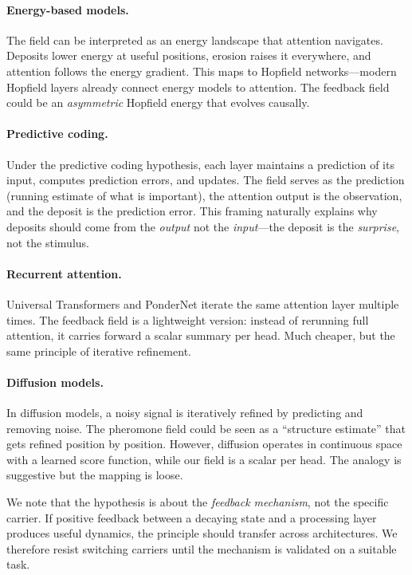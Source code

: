 \documentclass[11pt,a4paper]{article}
\begin{document}
\paragraph{Energy-based models.}
The field can be interpreted as an energy landscape that attention
navigates. Deposits lower energy at useful positions, erosion raises
it everywhere, and attention follows the energy gradient. This maps
to Hopfield networks---modern Hopfield layers \cite{ramsauer2021hopfield}
already connect energy models to attention. The feedback field could
be an \emph{asymmetric} Hopfield energy that evolves causally.

\paragraph{Predictive coding.}
Under the predictive coding hypothesis, each layer maintains a
prediction of its input, computes prediction errors, and updates.
The field serves as the prediction (running estimate of what is
important), the attention output is the observation, and the deposit
is the prediction error. This framing naturally explains why deposits
should come from the \emph{output} not the \emph{input}---the
deposit is the \emph{surprise}, not the stimulus.

\paragraph{Recurrent attention.}
Universal Transformers and PonderNet iterate the same attention layer
multiple times. The feedback field is a lightweight version: instead
of rerunning full attention, it carries forward a scalar summary per
head. Much cheaper, but the same principle of iterative refinement.

\paragraph{Diffusion models.}
In diffusion models, a noisy signal is iteratively refined by
predicting and removing noise. The pheromone field could be seen as a
``structure estimate'' that gets refined position by position. However,
diffusion operates in continuous space with a learned score function,
while our field is a scalar per head. The analogy is suggestive but
the mapping is loose.

We note that the hypothesis is about the \emph{feedback mechanism},
not the specific carrier. If positive feedback between a decaying
state and a processing layer produces useful dynamics, the principle
should transfer across architectures. We therefore resist switching
carriers until the mechanism is validated on a suitable task.
\end{document}
